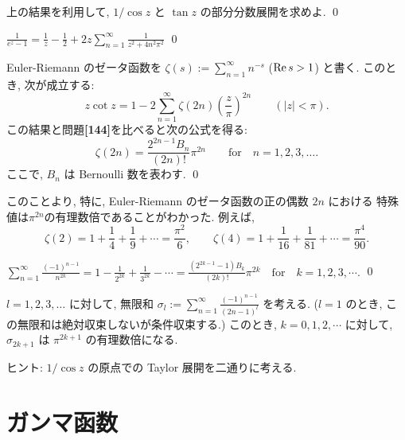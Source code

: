 \documentclass[12pt,twoside]{jarticle}
\begin{document}
\begin{question}
  上の結果を利用して, $1/\cos z$ と $\tan z$ の部分分数展開を求めよ.
  \qed
\end{question}

\begin{question}
  \(\displaystyle
    \frac{1}{e^z - 1} 
    =
    \frac{1}{z}
    - \frac{1}{2}
    + 2 z \sum_{n=1}^\infty \frac{1}{z^2 + 4n^2\pi^2}
  \)
  \qed
\end{question}

\begin{question}
  Euler-Riemann のゼータ函数を $\zeta(s) := \sum_{n=1}^\infty n^{-s}$ 
  ($\mathop{\mathrm{Re}}\nolimits s > 1$) と書く. このとき, 次が成立する:
  \[
    z \cot z
    =
    1 - 2 \sum_{n=1}^\infty \zeta(2n) \left(\frac{z}{\pi}\right)^{2n}
    \qquad (|z| < \pi).
  \]
  この結果と問題{\bf [144]}を比べると次の公式を得る:
  \[
    \zeta(2n) = \frac{2^{2n-1}B_n}{(2n)!} \pi^{2n}
    \qquad
    \mbox{for}\quad n = 1,2,3,\dots.
  \]
  ここで, $B_n$ は Bernoulli 数を表わす.
  \qed
\end{question}

\noindent %
このことより, 特に, Euler-Riemann のゼータ函数の正の偶数 $2n$ における
特殊値は$\pi^{2n}$の有理数倍であることがわかった. 例えば,
\[
  \zeta(2) = 1 + \frac{1}{4} + \frac{1}{9} + \cdots = \frac{\pi^2}{6},
  \qquad
  \zeta(4) = 1 + \frac{1}{16} + \frac{1}{81} + \cdots = \frac{\pi^4}{90}.
\]

\begin{question}
  \quad
  \(\displaystyle
    \sum_{n=1}^\infty \frac{(-1)^{n-1}}{n^{2k}}
    = 1 - \frac{1}{2^{2k}} + \frac{1}{3^{2k}} - \cdots
    = \frac{(2^{2k-1}-1)B_k}{(2k)!}\pi^{2k}
    \quad
    \mbox{for}\quad k = 1,2,3,\cdots.
  \)
  \qed
\end{question}

\begin{question}
  $l=1,2,3,\dots$ に対して, 無限和 %
  \(\displaystyle
    \sigma_l := \sum_{n=1}^\infty \frac{(-1)^{n-1}}{(2n-1)^l}
  \)%
  を考える. ($l=1$ のとき, この無限和は絶対収束しないが条件収束する.) 
  このとき, $k=0,1,2,\cdots$ に対して, $\sigma_{2k+1}$ は $\pi^{2k+1}$ 
  の有理数倍になる.
\end{question}

\noindent
ヒント: $1/\cos z$ の原点での Taylor 展開を二通りに考える. 


\section{ガンマ函数}
\end{document}
